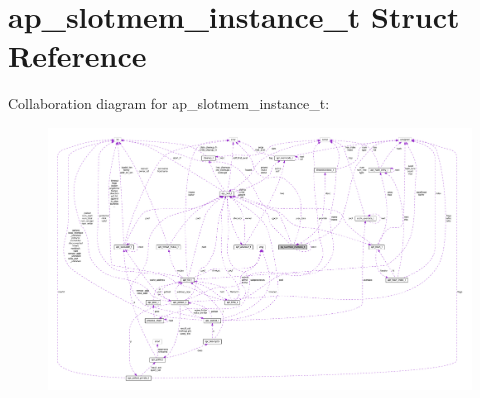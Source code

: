 \hypertarget{structap__slotmem__instance__t}{}\section{ap\+\_\+slotmem\+\_\+instance\+\_\+t Struct Reference}
\label{structap__slotmem__instance__t}


Collaboration diagram for ap\+\_\+slotmem\+\_\+instance\+\_\+t\+:
\nopagebreak
\begin{figure}[H]
\begin{center}
\leavevmode
\includegraphics[width=350pt]{structap__slotmem__instance__t__coll__graph}
\end{center}
\end{figure}
